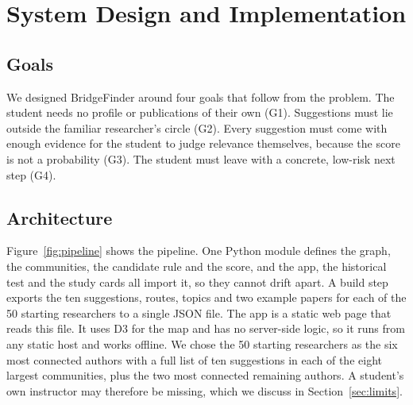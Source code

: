 \documentclass[sigconf,nonacm]{acmart}
\begin{document}
\section{System Design and Implementation}\label{sec:design}
\subsection{Goals}
We designed BridgeFinder around four goals that follow from the problem. The student needs no profile or publications of their own (G1). Suggestions must lie outside the familiar researcher's circle (G2). Every suggestion must come with enough evidence for the student to judge relevance themselves, because the score is not a probability (G3). The student must leave with a concrete, low-risk next step (G4).

\subsection{Architecture}
Figure~\ref{fig:pipeline} shows the pipeline. One Python module defines the graph, the communities, the candidate rule and the score, and the app, the historical test and the study cards all import it, so they cannot drift apart. A build step exports the ten suggestions, routes, topics and two example papers for each of the 50 starting researchers to a single JSON file. The app is a static web page that reads this file. It uses D3 for the map and has no server-side logic, so it runs from any static host and works offline. We chose the 50 starting researchers as the six most connected authors with a full list of ten suggestions in each of the eight largest communities, plus the two most connected remaining authors. A student's own instructor may therefore be missing, which we discuss in Section~\ref{sec:limits}.
\end{document}
